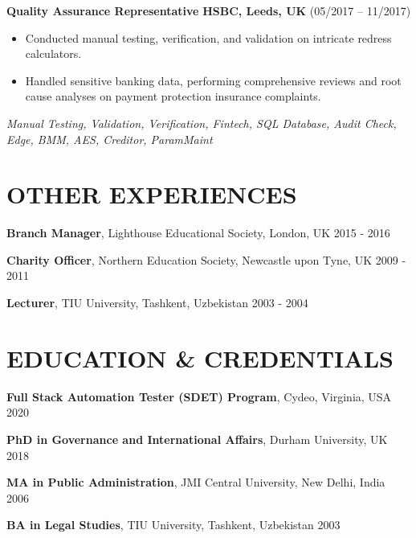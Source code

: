 \documentclass[11pt,a4paper]{article}
\begin{document}
    \noindent \textbf{Quality Assurance Representative} \hfill \textbf{HSBC, Leeds, UK} (05/2017 – 11/2017) \\
    \begin{itemize}
        \item Conducted manual testing, verification, and validation on intricate redress calculators.
        \item Handled sensitive banking data, performing comprehensive reviews and root cause analyses on payment protection insurance complaints.
    \end{itemize}
    \small \textit{Manual Testing, Validation, Verification, Fintech, SQL Database, Audit Check, Edge, BMM, AES, Creditor, ParamMaint}

    \section*{OTHER EXPERIENCES}

    \noindent \textbf{Branch Manager}, Lighthouse Educational Society, London, UK \hfill 2015 - 2016

    \noindent \textbf{Charity Officer}, Northern Education Society, Newcastle upon Tyne, UK \hfill 2009 - 2011

    \noindent \textbf{Lecturer}, TIU University, Tashkent, Uzbekistan \hfill 2003 - 2004

    \section*{EDUCATION \& CREDENTIALS}

    \noindent \textbf{Full Stack Automation Tester (SDET) Program}, Cydeo, Virginia, USA \hfill 2020

    \noindent \textbf{PhD in Governance and International Affairs}, Durham University, UK \hfill 2018

    \noindent \textbf{MA in Public Administration}, JMI Central University, New Delhi, India \hfill 2006

    \noindent \textbf{BA in Legal Studies}, TIU University, Tashkent, Uzbekistan \hfill 2003










\end{document}
